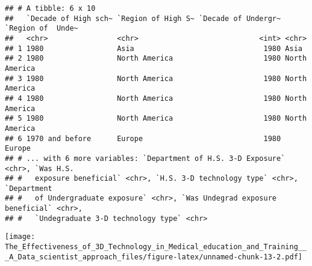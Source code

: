 \documentclass[]{article}
\newenvironment{Shaded}{\begin{snugshade}}{\end{snugshade}}
\newcommand{\DataTypeTok}[1]{\textcolor[rgb]{0.13,0.29,0.53}{#1}}
\newcommand{\KeywordTok}[1]{\textcolor[rgb]{0.13,0.29,0.53}{\textbf{#1}}}
\newcommand{\NormalTok}[1]{#1}
\newcommand{\OperatorTok}[1]{\textcolor[rgb]{0.81,0.36,0.00}{\textbf{#1}}}
\newcommand{\StringTok}[1]{\textcolor[rgb]{0.31,0.60,0.02}{#1}}
\begin{document}
\begin{verbatim}
## # A tibble: 6 x 10
##   `Decade of High sch~ `Region of High S~ `Decade of Undergr~ `Region of  Unde~
##   <chr>                <chr>                            <int> <chr>            
## 1 1980                 Asia                              1980 Asia             
## 2 1980                 North America                     1980 North America    
## 3 1980                 North America                     1980 North America    
## 4 1980                 North America                     1980 North America    
## 5 1980                 North America                     1980 North America    
## 6 1970 and before      Europe                            1980 Europe           
## # ... with 6 more variables: `Department of H.S. 3-D Exposure` <chr>, `Was H.S.
## #   exposure beneficial` <chr>, `H.S. 3-D technology type` <chr>, `Department
## #   of Undergraduate exposure` <chr>, `Was Undegrad exposure beneficial` <chr>,
## #   `Undegraduate 3-D technology type` <chr>
\end{verbatim}

\begin{Shaded}
\end{Shaded}

\texttt{[image: The\_Effectiveness\_of\_3D\_Technology\_in\_Medical\_education\_and\_Training\_\_\_A\_Data\_scientist\_approach\_files/figure-latex/unnamed-chunk-13-2.pdf]}

\begin{Shaded}
\end{Shaded}
\end{document}
